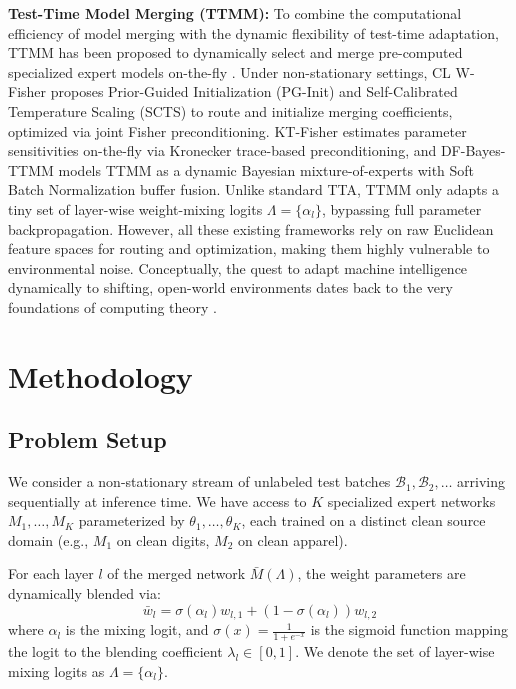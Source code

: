 \documentclass{article}
\theoremstyle{plain}
\theoremstyle{definition}
\theoremstyle{remark}
\begin{document}
\textbf{Test-Time Model Merging (TTMM):} To combine the computational efficiency of model merging with the dynamic flexibility of test-time adaptation, TTMM has been proposed to dynamically select and merge pre-computed specialized expert models on-the-fly \cite{bertolissi2025local}. Under non-stationary settings, CL W-Fisher \cite{clwfisher2026} proposes Prior-Guided Initialization (PG-Init) and Self-Calibrated Temperature Scaling (SCTS) to route and initialize merging coefficients, optimized via joint Fisher preconditioning. KT-Fisher \cite{ktfisher2026} estimates parameter sensitivities on-the-fly via Kronecker trace-based preconditioning, and DF-Bayes-TTMM \cite{dfbayes2026} models TTMM as a dynamic Bayesian mixture-of-experts with Soft Batch Normalization buffer fusion. Unlike standard TTA, TTMM only adapts a tiny set of layer-wise weight-mixing logits $\Lambda = \{\alpha_l\}$, bypassing full parameter backpropagation. However, all these existing frameworks rely on raw Euclidean feature spaces for routing and optimization, making them highly vulnerable to environmental noise. Conceptually, the quest to adapt machine intelligence dynamically to shifting, open-world environments dates back to the very foundations of computing theory \cite{turing50turing}.

\section{Methodology}
\label{submission:method}

\subsection{Problem Setup}
We consider a non-stationary stream of unlabeled test batches $\mathcal{B}_1, \mathcal{B}_2, \dots$ arriving sequentially at inference time. We have access to $K$ specialized expert networks $M_1, \dots, M_K$ parameterized by $\theta_1, \dots, \theta_K$, each trained on a distinct clean source domain (e.g., $M_1$ on clean digits, $M_2$ on clean apparel). 

For each layer $l$ of the merged network $\bar{M}(\Lambda)$, the weight parameters are dynamically blended via:
\begin{equation}
\bar{w}_l = \sigma(\alpha_l)w_{l,1} + (1 - \sigma(\alpha_l))w_{l,2}
\end{equation}
where $\alpha_l$ is the mixing logit, and $\sigma(x) = \frac{1}{1 + e^{-x}}$ is the sigmoid function mapping the logit to the blending coefficient $\lambda_l \in [0, 1]$. We denote the set of layer-wise mixing logits as $\Lambda = \{\alpha_l\}$.
\end{document}
